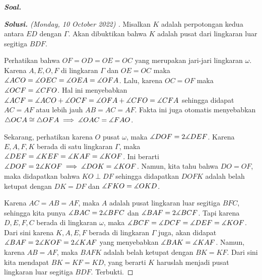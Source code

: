 \textbf{\textit{Soal. }}

\begin{proof}[\textbf{Solusi. } (Monday, 10 October 2022) ]
    Misalkan $K$ adalah perpotongan kedua antara $ED$ dengan $\Gamma$. Akan dibuktikan bahwa $K$ adalah pusat dari lingkaran luar segitiga $BDF$.

% 


Perhatikan bahwa $OF=OD=OE=OC$ yang merupakan jari-jari lingkaran $\omega$. Karena $A,E,O,F$ di lingkaran $\Gamma$ dan $OE=OC$ maka $\measuredangle ACO = \measuredangle OEC = \measuredangle OEA = \measuredangle OFA$. Lalu, karena $OC=OF$ maka $\measuredangle OCF = \measuredangle CFO$. Hal ini menyebabkan $\measuredangle ACF = \measuredangle ACO + \measuredangle OCF = \measuredangle OFA + \measuredangle CFO = \measuredangle CFA$ sehingga didapat $AC=AF$ atau lebih jauh $AB=AC=AF$. Fakta ini juga otomatis menyebabkan $\triangle OCA \cong \triangle OFA \implies \measuredangle OAC = \measuredangle FAO$.

Sekarang, perhatikan karena $O$ pusat $\omega$, maka $\measuredangle DOF = 2\measuredangle DEF$. Karena $E,A,F,K$ berada di satu lingkaran $\Gamma$, maka $\measuredangle DEF = \measuredangle KEF = \measuredangle KAF = \measuredangle KOF$. Ini berarti $\measuredangle DOF = 2\measuredangle KOF \implies \measuredangle DOK = \measuredangle KOF$. Namun, kita tahu bahwa $DO=OF$, maka didapatkan bahwa $KO \perp DF$ sehingga didapatkan $DOFK$ adalah belah ketupat dengan $DK=DF$ dan $\measuredangle FKO = \measuredangle OKD$.

Karena $AC=AB=AF$, maka $A$ adalah pusat lingkaran luar segitiga $BFC$, sehingga kita punya $\measuredangle BAC = 2\measuredangle BFC$ dan $\measuredangle BAF = 2\measuredangle BCF$. Tapi karena $D,E,F,C$ berada di lingkaran $\omega$, maka $\measuredangle BCF = \measuredangle DCF = \measuredangle DEF = \measuredangle KOF$. Dari sini karena $K,A,E,F$ berada di lingkaran $\Gamma$ juga, akan didapat $\measuredangle BAF = 2\measuredangle KOF = 2\measuredangle KAF$ yang menyebabkan $\measuredangle BAK = \measuredangle KAF$. Namun, karena $AB=AF$, maka $BAFK$ adalah belah ketupat dengan $BK=KF$. Dari sini kita mendapat $BK=KF=KD$, yang berarti $K$ haruslah menjadi pusat lingkaran luar segitiga $BDF$. Terbukti.



\end{proof}